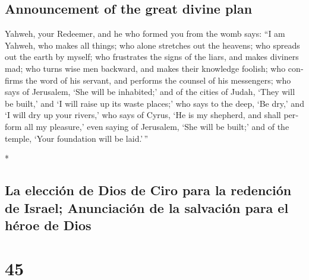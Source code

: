 \begin{paracol}{2}
\begin{otherlanguage}{english}
\hypertarget{announcement-of-the-great-divine-plan}{%
\subsection{Announcement of the great divine
plan}\label{announcement-of-the-great-divine-plan}}

 Yahweh, your Redeemer, and he who formed you from the
womb says: ``I am Yahweh, who makes all things; who alone stretches out
the heavens; who spreads out the earth by myself;  who
frustrates the signs of the liars, and makes diviners mad; who turns
wise men backward, and makes their knowledge foolish; 
who confirms the word of his servant, and performs the counsel of his
messengers; who says of Jerusalem, `She will be inhabited;' and of the
cities of Judah, `They will be built,' and `I will raise up its waste
places;'  who says to the deep, `Be dry,' and `I will dry
up your rivers,'  who says of Cyrus, `He is my shepherd,
and shall perform all my pleasure,' even saying of Jerusalem, `She will
be built;' and of the temple, `Your foundation will be laid.'\,''

\end{otherlanguage}

\switchcolumn[0]*

\hypertarget{la-elecciuxf3n-de-dios-de-ciro-para-la-redenciuxf3n-de-israel-anunciaciuxf3n-de-la-salvaciuxf3n-para-el-huxe9roe-de-dios}{%
\subsection{La elección de Dios de Ciro para la redención de Israel;
Anunciación de la salvación para el héroe de
Dios}\label{la-elecciuxf3n-de-dios-de-ciro-para-la-redenciuxf3n-de-israel-anunciaciuxf3n-de-la-salvaciuxf3n-para-el-huxe9roe-de-dios}}

\hypertarget{section-88}{%
\section{45}\label{section-88}}


\end{paracol}
